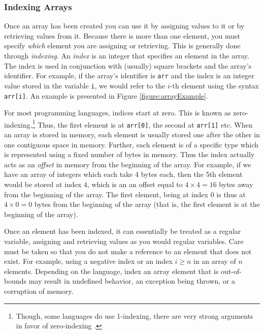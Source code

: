 \subsubsection{Indexing Arrays}

Once an array has been created you can use it by assigning values
to it or by retrieving values from it.  Because there is more than one
element, you must specify \emph{which} element you are assigning
or retrieving.  This is generally done through \emph{indexing}.  An 
\emph{index} is an integer that specifies an element in the array.
The index is used in conjunction with (usually) square brackets and
the array's identifier.  For example, if the array's identifier is 
\texttt{arr} and the index is an integer value stored in the 
variable \texttt{i}, we would refer to the $i$-th element using
the syntax \texttt{arr[i]}.  An example is presented in Figure
\ref{figure:arrayExample}.



For most programming languages, indices start at zero.  This is 
known as zero-indexing.\footnote{Though, some languages do 
use 1-indexing, there are very strong arguments in favor of 
zero-indexing \cite{Dijkstra82}.} Thus, the first element is at 
\texttt{arr[0]}, the second at \texttt{arr[1]}
etc.  When an array is stored in memory, each element is usually 
stored one after the other in one contiguous space in memory.  
Further, each element is of a specific type which is represented
using a fixed number of bytes in memory.  Thus the index actually
acts as an \emph{offset} in memory from the beginning of the
array.  For example, if we have an array of integers which each take
4 bytes each, then the 5th element would be stored at index $4$, 
which is an an offset equal to $4 \times 4 = 16$ bytes away from the 
beginning of the array.  The first element, being at index $0$ is thus
at $4 \times 0 = 0$ bytes from the beginning of the array (that is, 
the first element is at the beginning of the array).

Once an element has been indexed, it can essentially be treated as
a regular variable, assigning and retrieving values as you would regular
variables.  Care must be taken so that you do not make a reference
to an element that does not exist.  For example, using a negative
index or an index $i \geq n$ in an array of $n$ elements.  Depending
on the language, index an array element that is out-of-bounds may
result in undefined behavior, an exception being thrown, or a
corruption of memory.

